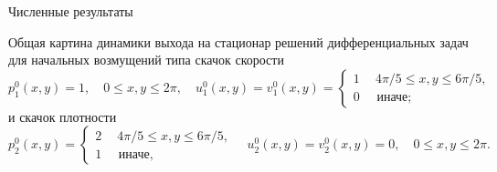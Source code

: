 \documentclass{beamer}
\theoremstyle{plain}
\begin{document}
\begin{frame}[shrink=40]{Численные результаты}

Общая картина динамики 
выхода на стационар решений дифференциальных задач
для начальных возмущений типа  скачок скорости
$$
  p_1^0(x,y) = 1,\quad  0 \le x,y\le 2\pi,
  \quad
  u_1^0(x,y) = v_1^0(x,y) =
  \begin{cases}
    1 \quad \  4\pi/5 \le x,y \le  6\pi / 5, \\
    0 \quad \text{ иначе};
  \end{cases}
$$
и скачок плотности
$$
 p_2^0(x,y) = 
  \begin{cases}
    2 \quad \  4\pi/5 \le x,y \le 6\pi / 5, \\
    1 \quad \text{ иначе},
  \end{cases}
  \quad
  u_2^0(x,y) = v_2^0(x,y) =0, \quad  0 \le x,y\le 2\pi.
$$


\end{frame}
\end{document}
